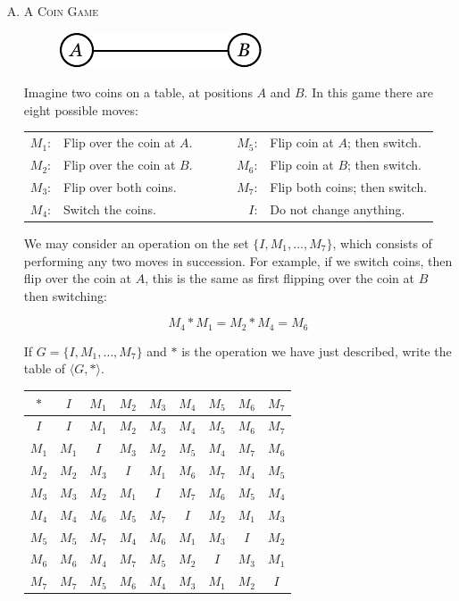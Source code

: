 \documentclass[twoside]{amsart}
\begin{document}
\begin{enumerate}[A.]
   

   \item \textsc{A Coin Game}
   \begin{figure}[ht]
      \includegraphics{img/coingame.pdf}
   \end{figure}

   Imagine two coins on a table, at positions $A$ and $B$. In this game there
   are eight possible moves:

   \begin{table}[ht]
   \begin{tabular}{rlcrl}
    $M_1$:&Flip over the coin at $A$. &\verb=   =& $M_5$:&Flip coin at $A$; then switch.\\
    $M_2$:&Flip over the coin at $B$. &\verb=   =& $M_6$:&Flip coin at $B$; then switch.\\
    $M_3$:&Flip over both coins. &\verb=   =& $M_7$:&Flip both coins; then switch.\\
    $M_4$:&Switch the coins.     &\verb=   =& $I$:&Do not change anything.
   \end{tabular}
   \end{table}


   We may consider an operation on the set $\{I, M_1,\ldots,M_7\}$, which
   consists of performing any two moves in succession.  For example, if we
   switch coins, then flip over the coin at $A$, this is the same as first
   flipping over the coin at $B$ then switching:

   $$ M_4 * M_1 = M_2 * M_4 = M_6 $$

   If $G = \{I,M_1,\ldots,M_7\}$ and $*$ is the operation we have just
   described, write the table of $\langle G,* \rangle$.

   \begin{table}[ht]
   \begin{tabular}{c|cccccccc}
     $*$ & $I$ & $M_1$ & $M_2$ & $M_3$ & $M_4$ & $M_5$ & $M_6$ & $M_7$ \\ \hline
     $I$ & $I$ & $M_1$ & $M_2$ & $M_3$ & $M_4$ & $M_5$ & $M_6$ & $M_7$\\
     $M_1$ & $M_1$ & $I$ & $M_3$ & $M_2$ & $M_5$ & $M_4$ & $M_7$ & $M_6$\\
     $M_2$ & $M_2$ & $M_3$ & $I$ & $M_1$ & $M_6$ & $M_7$ & $M_4$ & $M_5$\\
     $M_3$ & $M_3$ & $M_2$ & $M_1$ & $I$ & $M_7$ & $M_6$ & $M_5$ & $M_4$\\
     $M_4$ & $M_4$ & $M_6$ & $M_5$ & $M_7$ & $I$ & $M_2$ & $M_1$ & $M_3$\\
     $M_5$ & $M_5$ & $M_7$ & $M_4$ & $M_6$ & $M_1$ & $M_3$ & $I$ & $M_2$\\
     $M_6$ & $M_6$ & $M_4$ & $M_7$ & $M_5$ & $M_2$ & $I$ & $M_3$ & $M_1$\\
     $M_7$ & $M_7$ & $M_5$ & $M_6$ & $M_4$ & $M_3$ & $M_1$ & $M_2$ & $I$\\
   \end{tabular}
   \end{table}


\end{enumerate}
\end{document}
